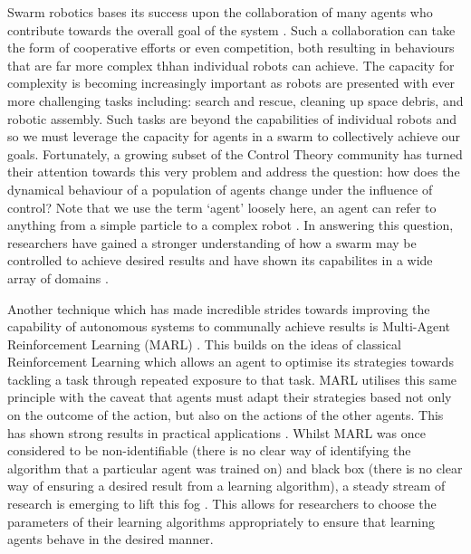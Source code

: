 \documentclass[.../main.tex]{subfiles}
\begin{document}
    Swarm robotics bases its success upon the collaboration of many
    agents who contribute towards the overall goal of the system
    \cite{Hamann2018}. Such a collaboration can take the form of cooperative efforts or even
    competition, both resulting in behaviours that are far more complex thhan individual robots can
    achieve. The capacity for complexity is
    becoming increasingly important as robots are presented
    with ever more challenging tasks including: search and rescue,
    cleaning up space debris, and robotic assembly. Such tasks are
    beyond the capabilities of individual robots and so we must
    leverage the capacity for agents in a swarm to collectively
    achieve our goals. Fortunately, a growing subset of the Control
    Theory community has turned their attention towards this very
    problem and address the question: how does the dynamical behaviour
    of a population of agents change under the influence of control?
    Note that we use the term `agent' loosely here, an agent can refer
    to anything from a simple particle \cite{Roy2017} to a complex
    robot \cite{Elamvazhuthi2019}. In answering this question,
    researchers have gained a stronger understanding of how a swarm
    may be controlled to achieve desired results and have shown its capabilites in a wide array of
    domains \cite{Sahin2005}.

    Another technique which has made incredible strides towards
    improving the capability of autonomous systems to communally
    achieve results is Multi-Agent Reinforcement Learning (MARL)
    \cite{SchwartzMulti-agentApproach}. This builds on the ideas of
    classical Reinforcement Learning which allows an agent to optimise
    its strategies towards tackling a task through repeated exposure
    to that task.  MARL utilises this same principle with the caveat
    that agents must adapt their strategies based not only on the
    outcome of the action, but also on the actions of the other
    agents. This has shown strong results in practical applications
    \cite{Woolridge2009, SchwartzMulti-agentApproach,
      Yang2004}. Whilst MARL was once considered to be
    non-identifiable (there is no clear way of identifying the
    algorithm that a particular agent was trained on) and black box
    (there is no clear way of ensuring a desired result from a
    learning algorithm), a steady stream of research is emerging to
    lift this fog \cite{Bloembergen2015}. This allows for researchers
    to choose the parameters of their learning algorithms
    appropriately to ensure that learning agents behave in the desired
    manner.
\end{document}
